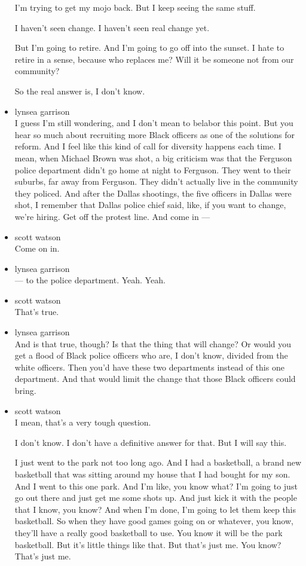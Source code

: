 \begin{itemize}
  I'm trying to get my mojo back. But I keep seeing the same stuff.

  I haven't seen change. I haven't seen real change yet.

  But I'm going to retire. And I'm going to go off into the sunset. I
  hate to retire in a sense, because who replaces me? Will it be someone
  not from our community?

  So the real answer is, I don't know.
\item
  lynsea garrison\\
  I guess I'm still wondering, and I don't mean to belabor this point.
  But you hear so much about recruiting more Black officers as one of
  the solutions for reform. And I feel like this kind of call for
  diversity happens each time. I mean, when Michael Brown was shot, a
  big criticism was that the Ferguson police department didn't go home
  at night to Ferguson. They went to their suburbs, far away from
  Ferguson. They didn't actually live in the community they policed. And
  after the Dallas shootings, the five officers in Dallas were shot, I
  remember that Dallas police chief said, like, if you want to change,
  we're hiring. Get off the protest line. And come in ---
\item
  scott watson\\
  Come on in.
\item
  lynsea garrison\\
  --- to the police department. Yeah. Yeah.
\item
  scott watson\\
  That's true.
\item
  lynsea garrison\\
  And is that true, though? Is that the thing that will change? Or would
  you get a flood of Black police officers who are, I don't know,
  divided from the white officers. Then you'd have these two departments
  instead of this one department. And that would limit the change that
  those Black officers could bring.
\item
  scott watson\\
  I mean, that's a very tough question.

  I don't know. I don't have a definitive answer for that. But I will
  say this.

  I just went to the park not too long ago. And I had a basketball, a
  brand new basketball that was sitting around my house that I had
  bought for my son. And I went to this one park. And I'm like, you know
  what? I'm going to just go out there and just get me some shots up.
  And just kick it with the people that I know, you know? And when I'm
  done, I'm going to let them keep this basketball. So when they have
  good games going on or whatever, you know, they'll have a really good
  basketball to use. You know it will be the park basketball. But it's
  little things like that. But that's just me. You know? That's just me.
\end{itemize}

